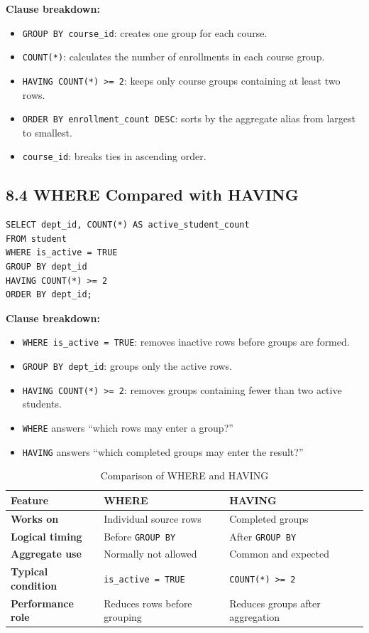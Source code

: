 \documentclass[12pt,a4paper]{article}
\begin{document}
\noindent\textbf{Clause breakdown:}
\begin{itemize}
    \item \texttt{GROUP BY course\_id}: creates one group for each course.
    \item \texttt{COUNT(*)}: calculates the number of enrollments in each course group.
    \item \texttt{HAVING COUNT(*) >= 2}: keeps only course groups containing at least two rows.
    \item \texttt{ORDER BY enrollment\_count DESC}: sorts by the aggregate alias from largest to
    smallest.
    \item \texttt{course\_id}: breaks ties in ascending order.
\end{itemize}

\subsection*{8.4 WHERE Compared with HAVING}
\begin{verbatim}
SELECT dept_id, COUNT(*) AS active_student_count
FROM student
WHERE is_active = TRUE
GROUP BY dept_id
HAVING COUNT(*) >= 2
ORDER BY dept_id;
\end{verbatim}

\noindent\textbf{Clause breakdown:}
\begin{itemize}
    \item \texttt{WHERE is\_active = TRUE}: removes inactive rows before groups are formed.
    \item \texttt{GROUP BY dept\_id}: groups only the active rows.
    \item \texttt{HAVING COUNT(*) >= 2}: removes groups containing fewer than two active students.
    \item \texttt{WHERE} answers ``which rows may enter a group?''
    \item \texttt{HAVING} answers ``which completed groups may enter the result?''
\end{itemize}

\begin{table}[H]
\centering
\renewcommand{\arraystretch}{1.35}
\begin{tabular}{>{\bfseries}p{3cm} p{4.5cm} p{4.5cm}}
\toprule
Feature & WHERE & HAVING \\
\midrule
Works on & Individual source rows & Completed groups \\
Logical timing & Before \texttt{GROUP BY} & After \texttt{GROUP BY} \\
Aggregate use & Normally not allowed & Common and expected \\
Typical condition & \texttt{is\_active = TRUE} & \texttt{COUNT(*) >= 2} \\
Performance role & Reduces rows before grouping & Reduces groups after aggregation \\
\bottomrule
\end{tabular}
\caption{Comparison of WHERE and HAVING}
\label{tab:where_having}
\end{table}
\end{document}
